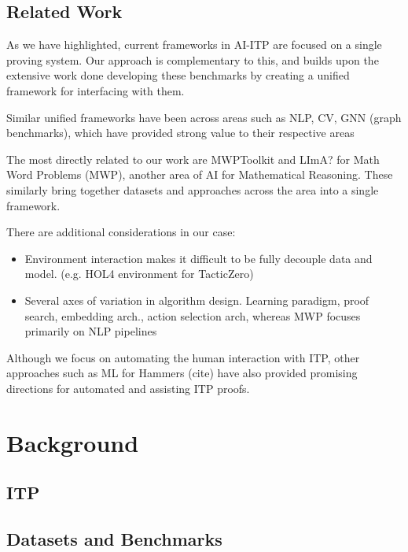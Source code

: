 \documentclass[letterpaper]{article} %
\begin{document}
    \subsection{Related Work}
    As we have highlighted, current frameworks in AI-ITP are focused on a single proving system.
    Our approach is complementary to this, and builds upon the extensive work done developing these benchmarks
    by creating a unified framework for interfacing with them.

    Similar unified frameworks have been across areas such as NLP, CV, GNN (graph benchmarks),
    which have provided strong value to their respective areas

    The most directly related to our work are MWPToolkit and LImA? for Math Word Problems (MWP),
    another area of AI for Mathematical Reasoning.
    These similarly bring together datasets and approaches across the area into a single framework.

    There are additional considerations in our case:

    \begin{itemize}
        \item Environment interaction makes it difficult to be fully decouple data and model. (e.g. HOL4 environment for TacticZero)
        \item Several axes of variation in algorithm design. Learning paradigm, proof search, embedding arch., action selection
        arch, whereas MWP focuses primarily on NLP pipelines
    \end{itemize}


    Although we focus on automating the human interaction with ITP, other approaches such as ML for Hammers (cite) have also
    provided promising directions for automated and assisting ITP proofs.


    \section{Background}

    \subsection{ITP}

    \subsection{Datasets and Benchmarks}
\end{document}
